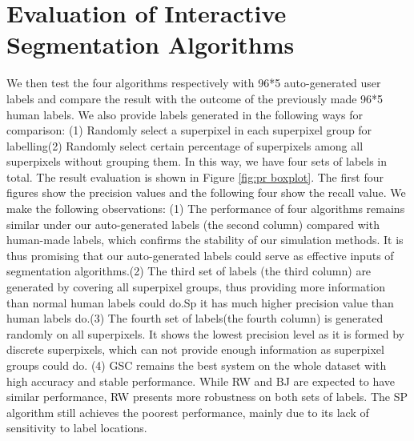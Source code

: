 \documentclass[runningheads,a4paper]{llncs}
\begin{document}
\section{Evaluation of Interactive Segmentation Algorithms}
We then test the four algorithms respectively with 96*5 auto-generated user labels and compare the result with the outcome of the previously made 96*5 human labels. We also provide labels generated in the following ways for comparison: (1) Randomly select a superpixel in each superpixel group for labelling(2) Randomly select certain percentage of superpixels among all superpixels without grouping them. In this way, we have four sets of labels in total. The result evaluation is shown in Figure \ref{fig:pr boxplot}. The first four figures show the precision values and the following four show the recall value. We make the following observations: (1) The performance of four algorithms remains similar under our auto-generated labels (the second column) compared with human-made labels, which confirms the stability of our simulation methods. It is thus promising that our auto-generated labels could serve as effective inputs of segmentation algorithms.(2) The third set of labels (the third column) are generated by covering all superpixel groups, thus providing more information than normal human labels could do.Sp it has much higher precision value than human labels do.(3) The fourth set of labels(the fourth column) is generated randomly on all superpixels. It shows the lowest precision level as it is formed by discrete superpixels, which can not provide enough information as superpixel groups could do.  (4) GSC \cite{gulshan2010geodesic} remains the best system on the whole dataset with high accuracy and stable performance. While RW \cite {grady2006random} and BJ \cite{boykov2001interactive}are expected to have similar performance, RW presents more robustness on both sets of labels. The SP\cite{bai2007geodesic} algorithm still achieves the poorest performance, mainly due to its lack of sensitivity to label locations.
\end{document}
